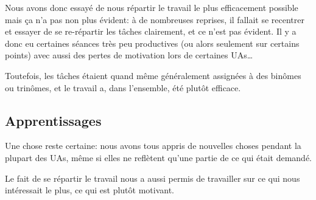 Nous avons donc essayé de nous répartir le travail le plus efficacement possible
mais ça n'a pas non plus évident: à de nombreuses reprises, il fallait se recentrer
et essayer de se re-répartir les tâches clairement, et ce n'est pas évident.
Il y a donc eu certaines séances très peu productives (ou alors seulement
sur certains points) avec aussi des pertes de motivation lors de certaines UAs\dots

Toutefois, les tâches étaient quand même généralement assignées à des binômes
ou trinômes, et le travail a, dans l'ensemble, été plutôt efficace.

\subsection{Apprentissages}


Une chose reste certaine: nous avons tous appris de nouvelles choses pendant
la plupart des UAs, même si elles ne reflètent qu'une partie de ce qui était demandé.

Le fait de se répartir le travail nous a aussi permis de travailler sur ce qui nous
intéressait le plus, ce qui est plutôt motivant.
